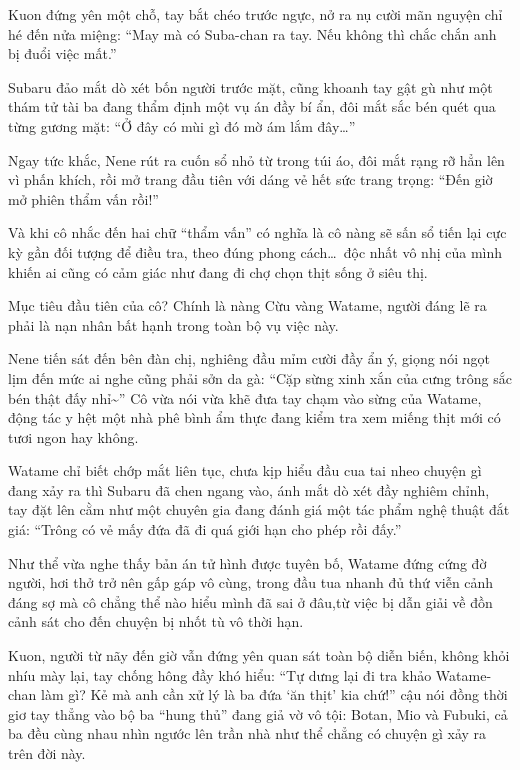 \documentclass[../main.tex]{subfiles}
\begin{document}
Kuon đứng yên một chỗ, tay bắt chéo trước ngực, nở ra nụ cười mãn nguyện chỉ hé đến nửa miệng: ``May mà có Suba-chan ra tay. Nếu không thì chắc chắn anh bị đuổi việc mất.''

Subaru đảo mắt dò xét bốn người trước mặt, cũng khoanh tay gật gù như một thám tử tài ba đang thẩm định một vụ án đầy bí ẩn, đôi mắt sắc bén quét qua từng gương mặt: ``Ở đây có mùi gì đó mờ ám lắm đây\dots''

Ngay tức khắc, Nene rút ra cuốn sổ nhỏ từ trong túi áo, đôi mắt rạng rỡ hẳn lên vì phấn khích, rồi mở trang đầu tiên với dáng vẻ hết sức trang trọng: ``Đến giờ mở phiên thẩm vấn rồi!''

Và khi cô nhắc đến hai chữ ``thẩm vấn'' có nghĩa là cô nàng sẽ sấn sổ tiến lại cực kỳ gần đối tượng để điều tra, theo đúng phong cách\dots\ độc nhất vô nhị của mình khiến ai cũng có cảm giác như đang đi chợ chọn thịt sống ở siêu thị.

Mục tiêu đầu tiên của cô? Chính là nàng Cừu vàng Watame, người đáng lẽ ra phải là nạn nhân bất hạnh trong toàn bộ vụ việc này.

Nene tiến sát đến bên đàn chị, nghiêng đầu mỉm cười đầy ẩn ý, giọng nói ngọt lịm đến mức ai nghe cũng phải sởn da gà: ``Cặp sừng xinh xắn của cưng trông sắc bén thật đấy nhỉ\~{}'' Cô vừa nói vừa khẽ đưa tay chạm vào sừng của Watame, động tác y hệt một nhà phê bình ẩm thực đang kiểm tra xem miếng thịt mới có tươi ngon hay không.

Watame chỉ biết chớp mắt liên tục, chưa kịp hiểu đầu cua tai nheo chuyện gì đang xảy ra thì Subaru đã chen ngang vào, ánh mắt dò xét đầy nghiêm chỉnh, tay đặt lên cằm như một chuyên gia đang đánh giá một tác phẩm nghệ thuật đắt giá: ``Trông có vẻ mấy đứa đã đi quá giới hạn cho phép rồi đấy.''

Như thể vừa nghe thấy bản án tử hình được tuyên bố, Watame đứng cứng đờ người, hơi thở trở nên gấp gáp vô cùng, trong đầu tua nhanh đủ thứ viễn cảnh đáng sợ mà cô chẳng thể nào hiểu mình đã sai ở đâu,từ việc bị dẫn giải về đồn cảnh sát cho đến chuyện bị nhốt tù vô thời hạn.


Kuon, người từ nãy đến giờ vẫn đứng yên quan sát toàn bộ diễn biến, không khỏi nhíu mày lại, tay chống hông đầy khó hiểu: ``Tự dưng lại đi tra khảo Watame-chan làm gì? Kẻ mà anh cần xử lý là ba đứa `ăn thịt' kia chứ!'' cậu nói đồng thời giơ tay thẳng vào bộ ba ``hung thủ'' đang giả vờ vô tội: Botan, Mio và Fubuki, cả ba đều cùng nhau nhìn ngước lên trần nhà như thể chẳng có chuyện gì xảy ra trên đời này.
\end{document}
